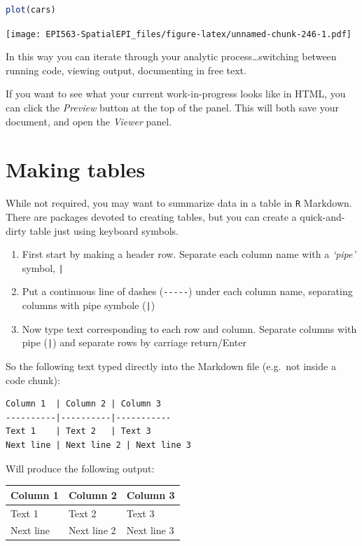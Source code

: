 \documentclass[
]{book}
\newcommand{\passthrough}[1]{#1}
\providecommand{\tightlist}{%
  \setlength{\itemsep}{0pt}\setlength{\parskip}{0pt}}
\begin{document}
\begin{lstlisting}[language=R]
plot(cars)
\end{lstlisting}

\texttt{[image: EPI563-SpatialEPI\_files/figure-latex/unnamed-chunk-246-1.pdf]}

In this way you can iterate through your analytic process\ldots switching between running code, viewing output, documenting in free text.

If you want to see what your current work-in-progress looks like in HTML, you can click the \emph{Preview} button at the top of the panel. This will both save your document, and open the \emph{Viewer} panel.

\hypertarget{making-tables}{%
\section*{Making tables}\label{making-tables}}

While not required, you may want to summarize data in a table in \passthrough{\lstinline!R!} Markdown. There are packages devoted to creating tables, but you can create a quick-and-dirty table just using keyboard symbols.

\begin{enumerate}
\def\labelenumi{\arabic{enumi}.}
\tightlist
\item
  First start by making a header row. Separate each column name with a \emph{`pipe'} symbol, \passthrough{\lstinline!|!}
\item
  Put a continuous line of dashes (\passthrough{\lstinline!-----!}) under each column name, separating columns with pipe symbole (\passthrough{\lstinline!|!})
\item
  Now type text corresponding to each row and column. Separate columns with pipe (\passthrough{\lstinline!|!}) and separate rows by carriage return/Enter
\end{enumerate}

So the following text typed directly into the Markdown file (e.g.~not inside a code chunk):

\begin{lstlisting}
Column 1  | Column 2 | Column 3
----------|----------|-----------
Text 1    | Text 2   | Text 3
Next line | Next line 2 | Next line 3
\end{lstlisting}

Will produce the following output:

\begin{longtable}[]{@{}lll@{}}
\toprule
Column 1 & Column 2 & Column 3\tabularnewline
\midrule
\endhead
Text 1 & Text 2 & Text 3\tabularnewline
Next line & Next line 2 & Next line 3\tabularnewline
\bottomrule
\end{longtable}
\end{document}
